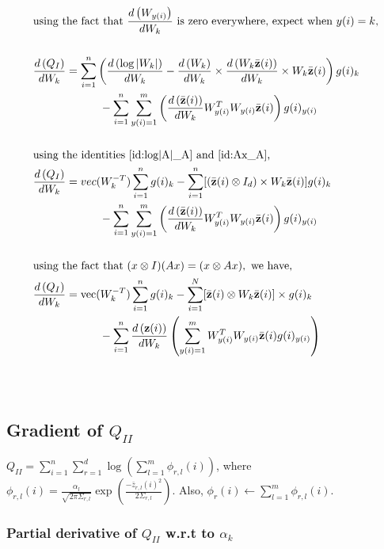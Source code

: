 \documentclass[]{article}
\begin{document}
\begin{align*}
&\text{using the fact that } \der{W_k}{W_{y(i)}} \text{ is zero everywhere, expect when } y(i)=k, \nonumber \\ \\
& \der{W_k}{Q_I} = \sum\limits_{i=1}^n \left( \der{W_k}{\log|W_k|} -  \der{W_k}{W_k} \times \der{W_k}{W_k\zbar{i}}\times W_k\zbar{i}  \right)g(i)_k  \\ 
& \qquad \qquad \qquad - \sum\limits_{i=1}^n \sum\limits_{y(i)=1}^m \left( \der{W_k}{\zbar{i}}W_{y(i)}^T  W_{y(i)}\zbar{i} \right) g(i)_{y(i)} \\ \\
& \text{using the identities \ref{id:log|A|_A} and \ref{id:Ax_A},} \\
& \der{W_k}{Q_I} = vec(W_k^{-T})\sum\limits_{i=1}^n g(i)_k -
\sum\limits_{i=1}^n [(\zbar{i}\otimes I_d) \times W_k\zbar{i}]g(i)_k  \\
& \qquad \qquad \qquad -\sum\limits_{i=1}^n \sum\limits_{y(i)=1}^m \left( \der{W_k}{\zbar{i}}W_{y(i)}^T  W_{y(i)}\zbar{i} \right) g(i)_{y(i)} \\ \\
& \text{using the fact that } (x \otimes I)(Ax) = (x \otimes Ax), \text{ we have, } \nonumber \\
& \der{W_k}{Q_I} = \textmd{vec}(W_k^{-T})\sum\limits_{i=1}^n g(i)_k - \sum\limits_{i=1}^N  [\zbar{i} \otimes W_k\zbar{i}] \times g(i)_k   \\ 
& \qquad \qquad \qquad - \sum\limits_{i=1}^n \der{W_k}{\textbf{z}(i)} \left( \sum\limits_{y(i)=1}^m W_{y(i)}^T  W_{y(i)} \zbar{i}g(i)_{y(i)} \right)
\end{align*}
\\ \\
\subsection{Gradient of $Q_{II}$}

$Q_{II} = \sum\limits_{i=1}^n \sum\limits_{r=1}^{d} \log\left(\sum\limits_{l=1}^{m}\phi_{r,l}(i)\right)$, where $\phi_{r,l}(i)= \frac{\alpha_l}{\sqrt{2\pi\Sigma_{r,l}}} \exp\left( \frac{-\bar{z}_{r,l}(i)^2}{2\Sigma_{r,l}}\right)$. Also, $ \phi_r(i) \leftarrow \sum\limits_{l=1}^{m}\phi_{r,l}(i)$.

\subsubsection*{Partial derivative of $Q_{II}$ w.r.t to $\alpha_k$ }
\end{document}

